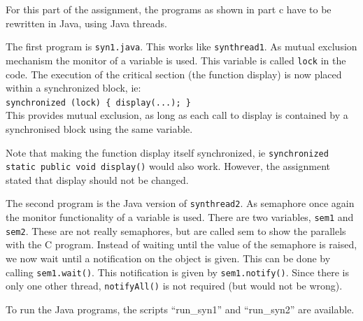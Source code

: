 \documentclass[a4paper]{article}
\begin{document}
For this part of the assignment, the programs as shown in part c have to be rewritten in
Java, using Java threads.

The first program is \texttt{syn1.java}. This works like \texttt{synthread1}. As mutual
exclusion mechanism the monitor of a variable is used. This variable is called 
\texttt{lock} in the code. The execution of the critical section (the function display)
is now placed within a synchronized block, ie: \\\texttt{synchronized (lock) \{ 
display(...); \} }\\
This provides mutual exclusion, as long as each call to display is contained by a 
synchronised block using the same variable.

Note that making the function display itself synchronized, ie \texttt{synchronized 
static public void display()} would also work. However, the assignment stated that display
should not be changed.

The second program is the Java version of \texttt{synthread2}. As semaphore once again the
monitor functionality of a variable is used. There are two variables, \texttt{sem1} and
\texttt{sem2}. These are not really semaphores, but are called sem to show the parallels 
with the C program. Instead of waiting until the value of the semaphore is raised, we now
wait until a notification on the object is given. This can be done by calling 
\texttt{sem1.wait()}. This notification is given by \texttt{sem1.notify()}. Since there is
only one other thread, \texttt{notifyAll()} is not required (but would not be wrong).

To run the Java programs, the scripts ``run\_syn1'' and ``run\_syn2'' are available.
\end{document}
